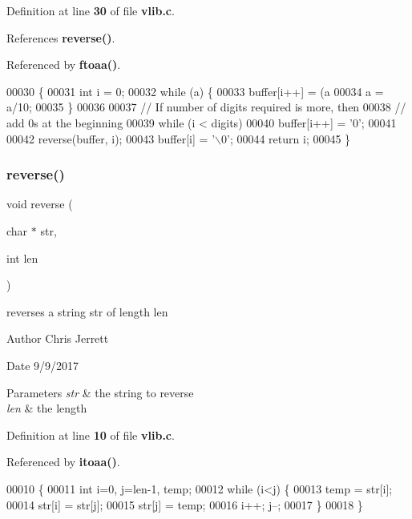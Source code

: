 Definition at line \textbf{ 30} of file \textbf{ vlib.\+c}.



References \textbf{ reverse()}.



Referenced by \textbf{ ftoaa()}.


\begin{DoxyCode}
00030                                            \{
00031   \textcolor{keywordtype}{int} i = 0;
00032    \textcolor{keywordflow}{while} (a) \{
00033        buffer[i++] = (a%
00034        a = a/10;
00035    \}
00036 
00037    \textcolor{comment}{// If number of digits required is more, then}
00038    \textcolor{comment}{// add 0s at the beginning}
00039    \textcolor{keywordflow}{while} (i < digits)
00040        buffer[i++] = \textcolor{charliteral}{'0'};
00041 
00042    reverse(buffer, i);
00043    buffer[i] = \textcolor{charliteral}{'\(\backslash\)0'};
00044    \textcolor{keywordflow}{return} i;
00045 \}
\end{DoxyCode}
\mbox{\label{vlib_8c_aad7fea725cb4b198ace1aa3df5051244}} 
\subsubsection{reverse()}
{\footnotesize\ttfamily void reverse (\begin{DoxyParamCaption}\item[{char $\ast$}]{str,  }\item[{int}]{len }\end{DoxyParamCaption})}



reverses a string \textquotesingle{}str\textquotesingle{} of length \textquotesingle{}len\textquotesingle{} 

\begin{DoxyAuthor}{Author}
Chris Jerrett 
\end{DoxyAuthor}
\begin{DoxyDate}{Date}
9/9/2017 
\end{DoxyDate}

\begin{DoxyParams}{Parameters}
{\em str} & the string to reverse \\
\hline
{\em len} & the length \\
\hline
\end{DoxyParams}


Definition at line \textbf{ 10} of file \textbf{ vlib.\+c}.



Referenced by \textbf{ itoaa()}.


\begin{DoxyCode}
00010                                  \{
00011     \textcolor{keywordtype}{int} i=0, j=len-1, temp;
00012     \textcolor{keywordflow}{while} (i<j) \{
00013         temp = str[i];
00014         str[i] = str[j];
00015         str[j] = temp;
00016         i++; j--;
00017     \}
00018 \}
\end{DoxyCode}
